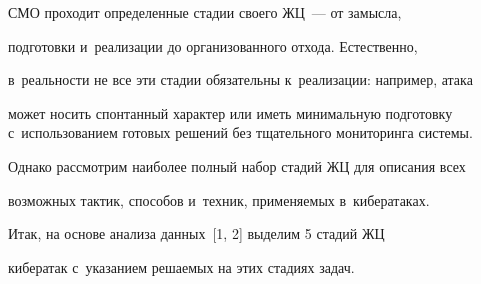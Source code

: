 СМО проходит определенные стадии своего ЖЦ~--- от замысла, 

подготовки и~реализации до организованного отхода. Естественно, 

в~реальности не все эти стадии обязательны к~реализации: например, атака 

может носить спонтанный характер или иметь минимальную подготовку с~использованием готовых решений без тщательного мониторинга системы. 

Однако рассмотрим наиболее полный набор стадий ЖЦ для описания всех 

возможных тактик, способов и~техник, применяемых в~кибератаках. 

    

    Итак, на основе анализа данных~[1, 2] выделим 5 стадий ЖЦ 

кибератак с~указанием решаемых на этих стадиях задач.

